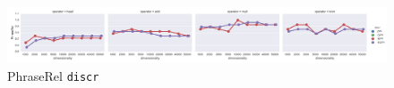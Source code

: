 \begin{figure}[b]
  \centering

  \includegraphics[width=1.1\textwidth]{supplement/figures/PhraseRel-interaction-discr}

  \caption{PhraseRel \texttt{discr}}
  \label{fig:phraserel-discr}
\end{figure}
